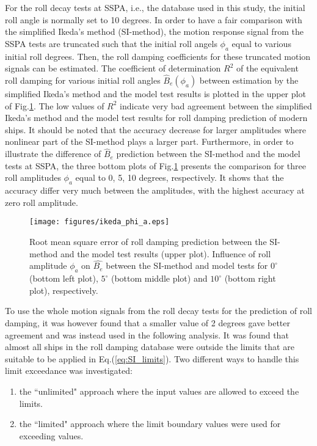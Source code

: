 For the roll decay tests at SSPA, i.e., the database used in this study, the initial roll angle is normally set to 10 degrees. In order to have a fair comparison with the simplified Ikeda's method (SI-method), the motion response signal from the SSPA tests are truncated such that the initial roll angels $\phi_a$ equal to various initial roll degrees. Then, the roll damping coefficients for these truncated motion signals can be estimated. The coefficient of determination $R^2$ of the equivalent roll damping for various initial roll angles $\hat{B}_e(\phi_a)$ between estimation by the simplified Ikeda's method and the model test results is plotted in the upper plot of Fig.\ref{fig:ikeda_phi_a}. The low values of $R^2$ indicate very bad agreement between the simplified Ikeda's method and the model test results for roll damping prediction of modern ships. It should be noted that the accuracy decrease for larger amplitudes where nonlinear part of the SI-method plays a larger part. Furthermore, in order to illustrate the difference of $\hat{B}_e$ prediction between the SI-method and the model tests at SSPA, the three bottom plots of Fig.\ref{fig:ikeda_phi_a} presents the comparison for three roll amplitudes $\phi_a$ equal to 0, 5, 10 degrees, respectively. It shows that the accuracy differ very much between the amplitudes, with the highest accuracy at zero roll amplitude. 


\begin{figure}[H]
\centering
  \centering
  \texttt{[image: figures/ikeda\_phi\_a.eps]}
  \vspace{-0.5cm}
  \caption{Root mean square error of roll damping prediction between the SI-method and the model test results (upper plot). Influence of roll amplitude $\phi_a$ on $\hat{B_e}$ between the SI-method and model tests for $0^{\circ}$ (bottom left plot), $5^{\circ}$ (bottom middle plot) and $10^{\circ}$ (bottom right plot), respectively.}
  \label{fig:ikeda_phi_a}
\end{figure}

To use the whole motion signals from the roll decay tests for the prediction of roll damping, it was however found that a smaller value of 2 degrees gave better agreement and was instead used in the following analysis. 
It was found that almost all ships in the roll damping database were outside the limits that are suitable to be applied in Eq.(\ref{eq:SI_limits}). Two different ways to handle this limit exceedance was investigated:
\begin{enumerate}
  \item the ``unlimited" approach where the input values are allowed to exceed the limits.
  \item the ``limited" approach where the limit boundary values were used for exceeding values.
\end{enumerate}

